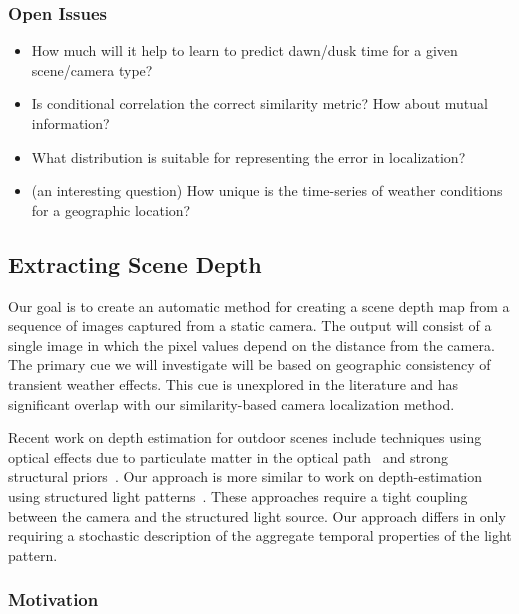 \subsubsection{Open Issues}

\begin{itemize}

  \item How much will it help to learn to predict dawn/dusk time for a
    given scene/camera type?

  \item Is conditional correlation the correct similarity metric?  How
    about mutual information?

  \item What distribution is suitable for representing the error in
    localization?

  \item (an interesting question) How unique is the time-series of
    weather conditions for a geographic location?

\end{itemize}


\subsection{Extracting Scene Depth}
\label{sec:depth}

Our goal is to create an automatic method for creating a scene depth
map from a sequence of images captured from a static camera.  The
output will consist of a single image in which the pixel values depend
on the distance from the camera.  The primary cue we will investigate
will be based on geographic consistency of transient weather effects.
This cue is unexplored in the literature and has significant overlap
with our similarity-based camera localization method.

Recent work on depth estimation for outdoor scenes include techniques
using optical effects due to particulate matter in the optical
path~\cite{contrastRestoration, novelDepth2009} and strong structural
priors~\cite{closingTheLoop}. Our approach is more similar to work on
depth-estimation using structured light
patterns~\cite{VaqueroCVPR2009,otherProjectedLight}.  These approaches
require a tight coupling between the camera and the structured light
source.  Our approach differs in only requiring a stochastic
description of the aggregate temporal properties of the light pattern.  

\subsubsection{Motivation}

